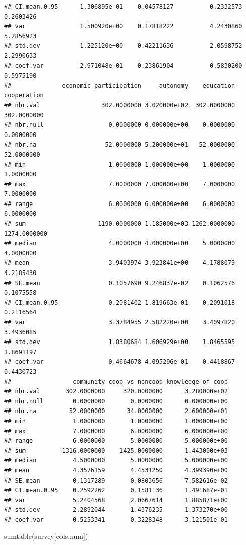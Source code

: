 \documentclass[
]{article}
\newenvironment{Shaded}{\begin{snugshade}}{\end{snugshade}}
\newcommand{\FunctionTok}[1]{\textcolor[rgb]{0.00,0.00,0.00}{#1}}
\newcommand{\NormalTok}[1]{#1}
\begin{document}
\begin{verbatim}
## CI.mean.0.95      1.306895e-01    0.04578127          0.2332573      0.2603426
## var               1.500920e+00    0.17818222          4.2430860      5.2856923
## std.dev           1.225120e+00    0.42211636          2.0598752      2.2990633
## coef.var          2.971048e-01    0.23861904          0.5830200      0.5975190
##              economic participation     autonomy    education  cooperation
## nbr.val                 302.0000000 3.020000e+02  302.0000000  302.0000000
## nbr.null                  0.0000000 0.000000e+00    0.0000000    0.0000000
## nbr.na                   52.0000000 5.200000e+01   52.0000000   52.0000000
## min                       1.0000000 1.000000e+00    1.0000000    1.0000000
## max                       7.0000000 7.000000e+00    7.0000000    7.0000000
## range                     6.0000000 6.000000e+00    6.0000000    6.0000000
## sum                    1190.0000000 1.185000e+03 1262.0000000 1274.0000000
## median                    4.0000000 4.000000e+00    5.0000000    4.0000000
## mean                      3.9403974 3.923841e+00    4.1788079    4.2185430
## SE.mean                   0.1057690 9.246837e-02    0.1062576    0.1075558
## CI.mean.0.95              0.2081402 1.819663e-01    0.2091018    0.2116564
## var                       3.3784955 2.582220e+00    3.4097820    3.4936085
## std.dev                   1.8380684 1.606929e+00    1.8465595    1.8691197
## coef.var                  0.4664678 4.095296e-01    0.4418867    0.4430723
##                 community coop vs noncoop knowledge of coop
## nbr.val       302.0000000     320.0000000      3.280000e+02
## nbr.null        0.0000000       0.0000000      0.000000e+00
## nbr.na         52.0000000      34.0000000      2.600000e+01
## min             1.0000000       1.0000000      1.000000e+00
## max             7.0000000       6.0000000      6.000000e+00
## range           6.0000000       5.0000000      5.000000e+00
## sum          1316.0000000    1425.0000000      1.443000e+03
## median          4.5000000       5.0000000      5.000000e+00
## mean            4.3576159       4.4531250      4.399390e+00
## SE.mean         0.1317289       0.0803656      7.582616e-02
## CI.mean.0.95    0.2592262       0.1581136      1.491687e-01
## var             5.2404568       2.0667614      1.885871e+00
## std.dev         2.2892044       1.4376235      1.373270e+00
## coef.var        0.5253341       0.3228348      3.121501e-01
\end{verbatim}

\begin{Shaded}
\begin{Highlighting}[]
\FunctionTok{sumtable}\NormalTok{(survey[cols.num])}
\end{Highlighting}
\end{Shaded}
\end{document}
